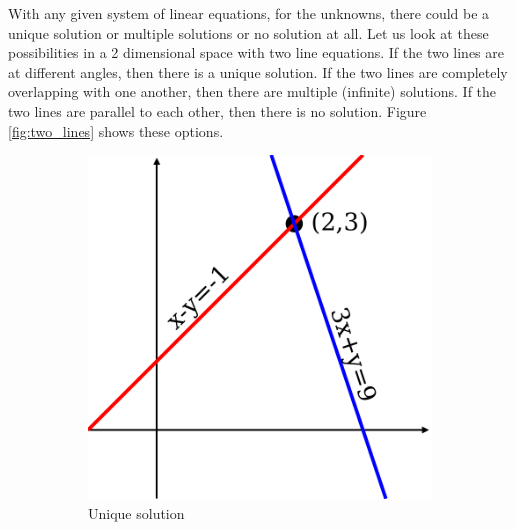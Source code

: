 With any given system of linear equations, for the unknowns, there could be a unique solution or multiple solutions or no solution at all. Let us look at these possibilities in a 2 dimensional space with two line equations. If the two lines are at different angles, then there is a unique solution. If the two lines are completely overlapping with one another, then there are multiple (infinite) solutions. If the two lines are parallel to each other, then there is no solution. Figure \ref{fig:two_lines} shows these options.
	\begin{figure}[h!]
	\label{fig:Linear_Algebra/two_lines}
	\centering
		\begin{subfigure}{0.3\textwidth}
		\includegraphics[width=\textwidth]{Linear_Algebra/intersecting_lines}
		\caption{Unique solution}
		\end{subfigure}
		\hspace{1em}
		\begin{subfigure}{0.3\textwidth}

\end{subfigure}
\end{figure}
